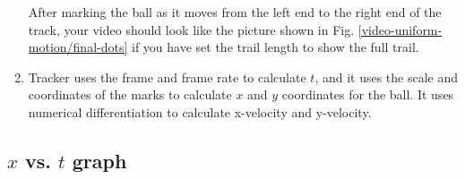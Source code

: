 \begin{enumerate}
	
	
	 After marking the ball as it moves from the left end to the right end of the track, your video should look like the picture shown in Fig. \ref{video-uniform-motion/final-dots} if you have set the trail length to show the full trail.
		
		
	\item Tracker uses the frame and frame rate to calculate $t$, and it uses the scale and coordinates of the marks to calculate $x$ and $y$ coordinates for the ball. It uses numerical differentiation to calculate x-velocity and y-velocity.
\end{enumerate}

\analysis

\subsection*{$x$ vs. $t$ graph}

